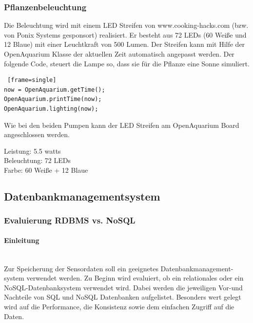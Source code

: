 \subsubsection{Pflanzenbeleuchtung}
Die Beleuchtung wird mit einem LED Streifen von www.cooking-hacks.com (bzw. von Ponix Systems gesponsort) realisiert. Er besteht aus 72 LEDs (60 Weiße und 12 Blaue) mit einer Leuchtkraft von 500 Lumen. Der Streifen kann mit Hilfe der OpenAquarium Klasse der aktuellen Zeit automatisch angepasst werden. Der folgende Code, steuert die Lampe so, dass sie für die Pflanze eine Sonne simuliert.
\begin{lstlisting} [frame=single]
now = OpenAquarium.getTime();
OpenAquarium.printTime(now);
OpenAquarium.lighting(now);
\end{lstlisting}
Wie bei den beiden Pumpen kann der LED Streifen am OpenAquarium Board angeschlossen werden. \\
\begin{minipage}{5in}
  \centering
\end{minipage} 
Leistung: 5.5 watts \\
Beleuchtung: 72 LEDs \\
Farbe: 60 Weiße + 12 Blaue \\
\newpage

\subsection{Datenbankmanagementsystem}

\subsubsection{Evaluierung RDBMS vs. NoSQL}

\paragraph{Einleitung} \mbox{}\\
Zur Speicherung der Sensordaten soll ein geeignetes Datenbankmanagement-\\ system verwendet werden. Zu Beginn wird evaluiert, ob ein relationales oder ein NoSQL-Datenbanksystem verwendet wird. Dabei werden die jeweiligen Vor-und Nachteile von SQL und NoSQL Datenbanken aufgelistet. Besonders wert gelegt wird auf die Performance, die Konsistenz sowie dem einfachen Zugriff auf die Daten.

